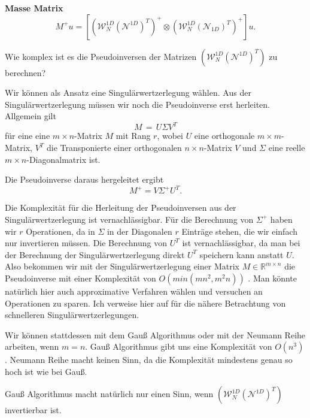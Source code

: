 \textbf{Masse Matrix} 
\begin{equation*}
M^{+}u =  [(\mathcal{W}_N^{1D} (\mathcal{N}^{1D})^T)^+ \otimes (\mathcal{W}_N^{1D} (\mathcal{N}_{1D})^T)^+]u.
\end{equation*}



Wie komplex ist es die Pseudoinversen der Matrizen $(\mathcal{W}_N^{1D} (\mathcal{N}^{1D})^T)$  zu berechnen?

Wir können als Ansatz eine Singulärwertzerlegung wählen. Aus der Singulärwertzerlegung müssen wir noch die Pseudoinverse erst herleiten.
Allgemein gilt
\begin{equation*}
M\,=\,U\Sigma V^{T}
\end{equation*}
für eine eine $m \times n$-Matrix $M$ mit Rang $r$, wobei
$U$ eine orthogonale $m\times m$-Matrix, $V^{T}$ die Transponierte einer orthogonalen $n\times n$-Matrix $V$ und
$\Sigma$  eine reelle  $m\times n$-Diagonalmatrix ist.

Die Pseudoinverse daraus hergeleitet ergibt
\begin{equation*}
M^{+}=V\Sigma ^{+}U^{T}.
\end{equation*}

Die Komplexität für die Herleitung der Pseudoinversen aus der Singulärwertzerlegung ist vernachlässigbar. Für die Berechnung von $\Sigma^+$ haben wir $r$ Operationen, da in $\Sigma$ in der Diagonalen $r$ Einträge stehen, die wir einfach nur invertieren müssen. Die Berechnung von $U^{T}$ ist vernachlässigbar, da man bei der Berechnung der Singulärwertzerlegung direkt $U^{T}$ speichern kann anstatt $U$.
Also bekommen wir mit der Singulärwertzerlegung einer Matrix $M \in \mathbb{R}^{m \times n}$ die Pseudoinverse mit einer Komplexität von $O(min(mn^2,m^2 n))$ \cite[2]{SVD}. Man könnte natürlich hier auch approximative Verfahren wählen und versuchen an Operationen zu sparen. Ich verweise hier auf \cite{SVD} für die nähere Betrachtung von schnelleren Singulärwertzerlegungen.


Wir können stattdessen mit dem Gauß Algorithmus oder mit der Neumann Reihe arbeiten, wenn $m=n$. Gauß Algorithmus gibt uns eine Komplexität von $O(n^3)$. 
Neumann Reihe macht keinen Sinn, da die Komplexität mindestens genau so hoch ist wie bei Gauß.

Gauß Algorithmus macht natürlich nur einen Sinn, wenn $(\mathcal{W}_N^{1D} (\mathcal{N}^{1D})^T)$ invertierbar ist.

